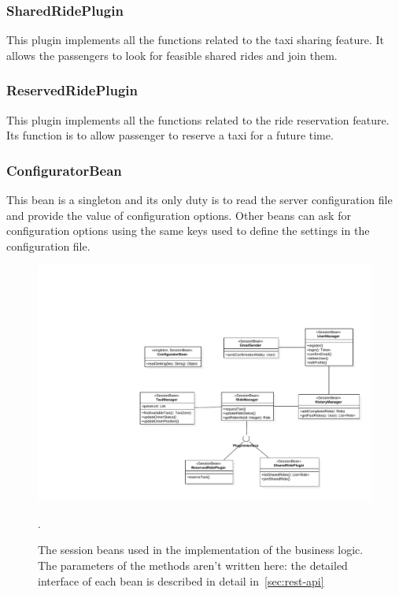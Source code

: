 \subsubsection{SharedRidePlugin}
This plugin implements all the functions related to the taxi sharing feature.
It allows the passengers to look for feasible shared rides and join them.

\subsubsection{ReservedRidePlugin}
This plugin implements all the functions related to the ride reservation feature.
Its function is to allow passenger to reserve a taxi for a future time.

\subsubsection{ConfiguratorBean}
This bean is a singleton and its only duty is to read the server configuration file and provide the value of configuration options. Other beans can ask for configuration options using the same keys used to define the settings in the configuration file.

\begin{figure}
    \centering
    \includegraphics[width=\textwidth]{diagrams/class_sessionbeans}
    \caption{The session beans used in the implementation of the business logic. The parameters of the methods aren't written here: the detailed interface of each bean is described in detail in~\autoref{sec:rest-api}}.
    \label{fig:session-beans}
\end{figure}


